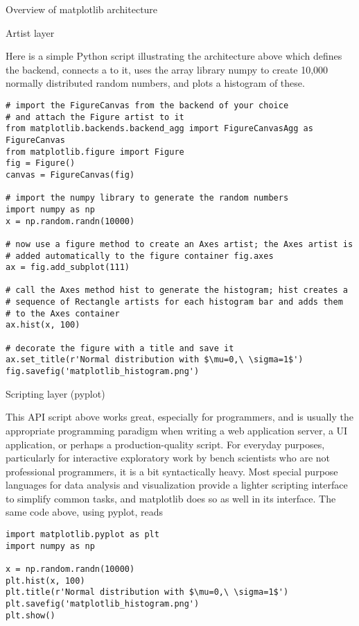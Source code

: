 \begin{aosasect1}{Overview of matplotlib architecture}
\begin{aosasect2}{Artist layer}
\end{aosasect2}

Here is a simple Python script illustrating the architecture above
which defines the backend, connects a  to it, uses the array
library numpy to create 10,000 normally distributed random numbers,
and plots a histogram of these.

\begin{verbatim}
# import the FigureCanvas from the backend of your choice
# and attach the Figure artist to it
from matplotlib.backends.backend_agg import FigureCanvasAgg as FigureCanvas
from matplotlib.figure import Figure
fig = Figure()
canvas = FigureCanvas(fig)

# import the numpy library to generate the random numbers
import numpy as np
x = np.random.randn(10000)

# now use a figure method to create an Axes artist; the Axes artist is
# added automatically to the figure container fig.axes
ax = fig.add_subplot(111)

# call the Axes method hist to generate the histogram; hist creates a
# sequence of Rectangle artists for each histogram bar and adds them
# to the Axes container
ax.hist(x, 100)

# decorate the figure with a title and save it
ax.set_title(r'Normal distribution with $\mu=0,\ \sigma=1$')
fig.savefig('matplotlib_histogram.png')
\end{verbatim}

\begin{aosasect2}{Scripting layer (pyplot)}


This API script above works great, especially for programmers, and is
usually the appropriate programming paradigm when writing a web
application server, a UI application, or perhaps a production-quality
script.  For everyday purposes, particularly for interactive
exploratory work by bench scientists who are not professional
programmers, it is a bit syntactically heavy.  Most special purpose
languages for data analysis and visualization provide a lighter
scripting interface to simplify common tasks, and matplotlib does so
as well in its  interface.  The same code
above, using pyplot, reads

\begin{verbatim}
import matplotlib.pyplot as plt
import numpy as np

x = np.random.randn(10000)
plt.hist(x, 100)
plt.title(r'Normal distribution with $\mu=0,\ \sigma=1$')
plt.savefig('matplotlib_histogram.png')
plt.show()
\end{verbatim}


\end{aosasect2}
\end{aosasect1}
